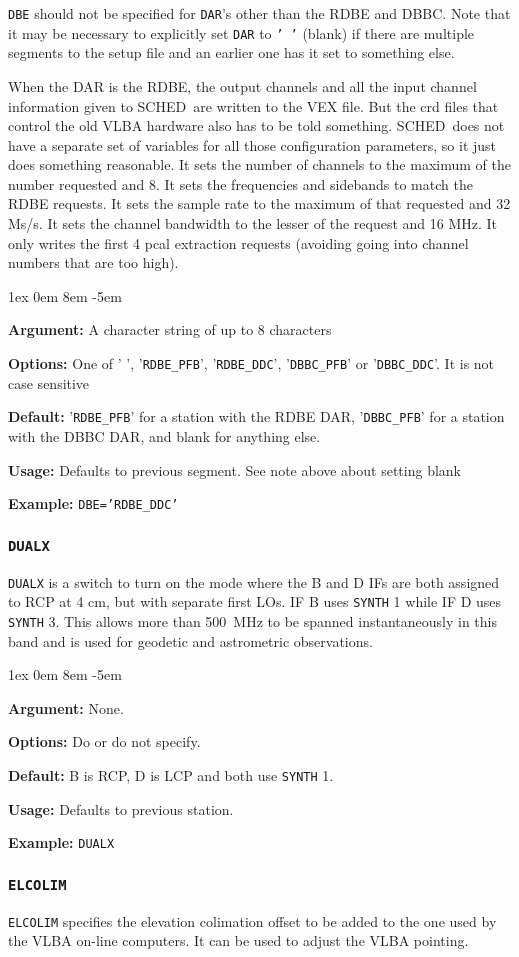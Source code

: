 \documentclass{report}
\newcommand{\schedb}{{\sc SCHED~}}
\newcommand{\rcwbox}[5]{
  \begin{list}{}{\parsep 1ex  \itemsep 0em
                 \leftmargin 8em  \itemindent -5em }
    \item {\bf Argument:} #1
    \item {\bf Options:}  #2
    \item {\bf Default:}  #3
    \item {\bf Usage:}    #4
    \item {\bf Example:}  #5
  \end{list}
}
\begin{document}
{\tt DBE} should not be specified for {\tt DAR}'s other than the RDBE
and DBBC.  Note that it may be necessary to explicitly set {\tt DAR}
to {\tt ' '} (blank) if there are multiple segments to the setup file
and an earlier one has it set to something else.

When the DAR is the RDBE, the output channels and all the input channel
information given to \schedb are written to the VEX file.  But the crd
files that control the old VLBA hardware also has to be told something.
\schedb does not have a separate set of variables for all those configuration
parameters, so it just does something reasonable.  It sets the number of
channels to the maximum of the number requested and 8.  It sets the
frequencies and sidebands to match the RDBE requests.  It sets the
sample rate to the maximum of that requested and 32 Ms/s.  It sets the
channel bandwidth to the lesser of the request and 16 MHz.  It only
writes the first 4 pcal extraction requests (avoiding going into
channel numbers that are too high).

\rcwbox
{A character string of up to 8 characters}
{One of ' ', '{\tt RDBE\_PFB}', '{\tt RDBE\_DDC}', '{\tt DBBC\_PFB}' or
'{\tt DBBC\_DDC}'. It is not case sensitive}
{'{\tt RDBE\_PFB}' for a station with the RDBE DAR, '{\tt DBBC\_PFB}' 
for a station with the DBBC DAR, and blank for anything else.}
{Defaults to previous segment.  See note above about setting blank}
{{\tt DBE='RDBE\_DDC'}}


\subsubsection{\label{SP:DUALX}{\tt DUALX}}

{\tt DUALX} is a switch to turn on the mode where the B and D IFs
are both assigned to RCP at 4 cm, but with separate first LOs. IF B
uses {\tt SYNTH} 1 while IF D uses {\tt SYNTH} 3. This allows more
than 500~MHz to be spanned instantaneously in this band and is used
for geodetic and astrometric observations.

\rcwbox
{None.}
{Do or do not specify.}
{B is RCP, D is LCP and both use {\tt SYNTH} 1.}
{Defaults to previous station.}
{{\tt DUALX}}


\subsubsection{\label{SP:ELCOLIM}{\tt ELCOLIM}}

{\tt ELCOLIM} specifies the elevation colimation offset to be added to
the one used by the VLBA on-line computers.  It can be used to adjust
the VLBA pointing.
\end{document}
